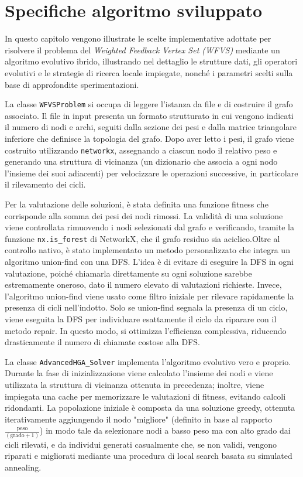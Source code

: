 \documentclass[12pt,a4paper,twoside]{article}
\begin{document}
\section{Specifiche algoritmo sviluppato}
In questo capitolo vengono illustrate le scelte implementative adottate per risolvere il problema del \emph{Weighted Feedback Vertex Set (WFVS)} mediante un algoritmo evolutivo ibrido, illustrando nel dettaglio le strutture dati, gli operatori evolutivi e le strategie di ricerca locale impiegate, nonché i parametri scelti sulla base di approfondite sperimentazioni.

\noindent La classe \texttt{WFVSProblem} si occupa di leggere l'istanza da file e di costruire il grafo associato. Il file in input presenta un formato strutturato in cui vengono indicati il numero di nodi e archi, seguiti dalla sezione dei pesi e dalla matrice triangolare inferiore che definisce la topologia del grafo. Dopo aver letto i pesi, il grafo viene costruito utilizzando \texttt{networkx}, assegnando a ciascun nodo il relativo peso e generando una struttura di vicinanza (un dizionario che associa a ogni nodo l'insieme dei suoi adiacenti) per velocizzare le operazioni successive, in particolare il rilevamento dei cicli.

\noindent Per la valutazione delle soluzioni, è stata definita una funzione fitness che corrisponde alla somma dei pesi dei nodi rimossi. La validità di una soluzione viene controllata rimuovendo i nodi selezionati dal grafo e verificando, tramite la funzione \texttt{nx.is\_forest} di NetworkX, che il grafo residuo sia aciclico.Oltre al controllo nativo, è stato implementato un metodo personalizzato che integra un algoritmo union-find con una DFS. L'idea è di evitare di eseguire la DFS in ogni valutazione, poiché chiamarla direttamente su ogni soluzione sarebbe estremamente oneroso, dato il numero elevato di valutazioni richieste. Invece, l'algoritmo union-find viene usato come filtro iniziale per rilevare rapidamente la presenza di cicli nell'indotto. Solo se union-find segnala la presenza di un ciclo, viene eseguita la DFS per individuare esattamente il ciclo da riparare con il metodo repair. In questo modo, si ottimizza l'efficienza complessiva, riducendo drasticamente il numero di chiamate costose alla DFS.

\noindent La classe \texttt{AdvancedHGA\_Solver} implementa l'algoritmo evolutivo vero e proprio. Durante la fase di inizializzazione viene calcolato l'insieme dei nodi e viene utilizzata la struttura di vicinanza ottenuta in precedenza; inoltre, viene impiegata una cache per memorizzare le valutazioni di fitness, evitando calcoli ridondanti. La popolazione iniziale è composta da una soluzione greedy, ottenuta iterativamente aggiungendo il nodo "migliore" (definito in base al rapporto \(\frac{\text{peso}}{(\text{grado}+1)}\)) in modo tale da selezionare nodi a basso peso ma con alto grado dai cicli rilevati, e da individui generati casualmente che, se non validi, vengono riparati e migliorati mediante una procedura di local search basata su simulated annealing.
\end{document}
